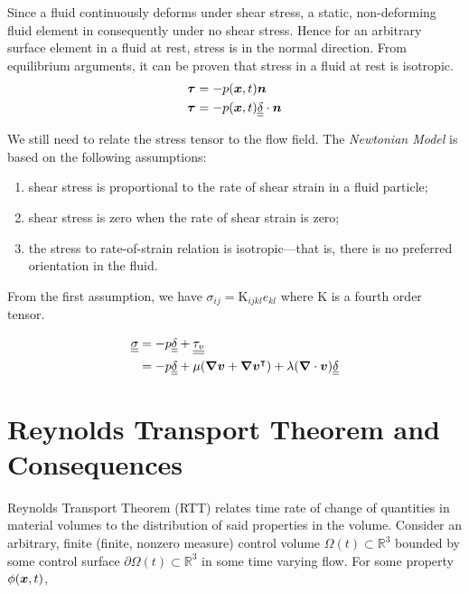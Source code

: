 Since a fluid continuously deforms under shear stress, a static, non-deforming fluid element in consequently under no shear stress. Hence for an arbitrary surface element in a fluid at rest, stress is in the normal direction. From equilibrium arguments, it can be proven that stress in a fluid at rest is isotropic.
\begin{equation}
\begin{split}
    \boldsymbol{\tau} &= -p(\boldsymbol{x},t)\boldsymbol{n} \\
    \boldsymbol{\tau} &= -p(\boldsymbol{x},t)\underline{\underline{\delta}}\cdot\boldsymbol{n}
\end{split}
\end{equation}

We still need to relate the stress tensor to the flow field. The \textit{Newtonian Model} is based on the following assumptions:
\begin{enumerate}
    \item shear stress is proportional to the rate of shear strain in a fluid particle;
    \item shear stress is zero when the rate of shear strain is zero;
    \item the stress to rate-of-strain relation is isotropic—that is, there is no preferred orientation in the fluid.
\end{enumerate}
From the first assumption, we have $\sigma_{ij}=\mathrm{K}_{ijkl}e_{kl}$ where $\mathrm{K}$ is a fourth order tensor.

\begin{equation}
\begin{split}
\underline{\underline{\sigma}}&= -p\underline{\underline{\delta}}+\underline{\underline{\tau_v}} \\
&= -p\underline{\underline{\delta}} + \mu(\boldsymbol{\nabla}\boldsymbol{v}+\boldsymbol{\nabla}\boldsymbol{v}^\intercal) + \lambda(\boldsymbol{\nabla}\cdot\boldsymbol{v})\underline{\underline{\delta}}
\end{split}
\end{equation}
\section{Reynolds Transport Theorem and Consequences}
Reynolds Transport Theorem (RTT) relates time rate of change of quantities in material volumes to the distribution of said properties in the volume. Consider an arbitrary, finite (finite, nonzero measure) control volume $\Omega(t)\subset\mathbb{R}^3$ bounded by some control surface $\partial\Omega(t)\subset\mathbb{R}^3$ in some time varying flow.
For some property $\phi(\boldsymbol{x},t)$,

